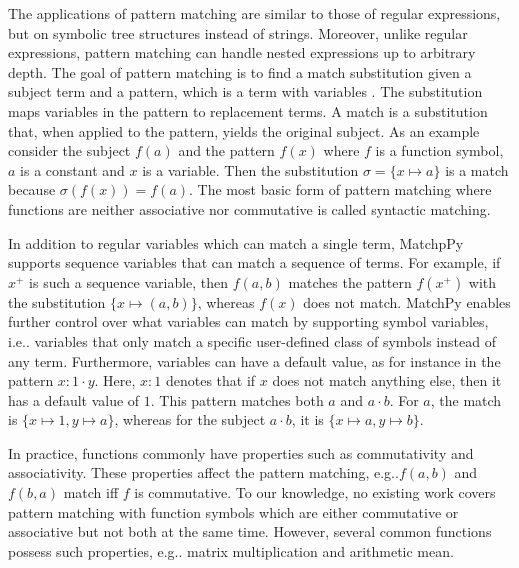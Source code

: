 \documentclass[conference,compsoc]{IEEEtran}
\makeatletter
\DeclareRobustCommand\onedot{\futurelet\@let@token\@onedot}
\def\@onedot{\ifx\@let@token.\else.\null\fi\xspace}
\def\eg{{e.g}\onedot} \def\Eg{{E.g}\onedot}
\def\ie{{i.e}\onedot} \def\Ie{{I.e}\onedot}
\newcommand{\regvar}[1]{#1}
\newcommand{\plusvar}[1]{{#1}^+}
\newcommand{\henrik}[1]{{\color{rwthgreen} Henrik: #1}}
\makeatother
\begin{document}
The applications of pattern matching are similar to those of regular expressions, but on symbolic tree structures instead of strings.
Moreover, unlike regular expressions, pattern matching can handle nested expressions up to arbitrary depth.
The goal of pattern matching is to find a match substitution given a subject term and a pattern, which is a term with variables \cite{Baader1998}.
The substitution maps variables in the pattern to replacement terms.
A match is a substitution that, when applied to the pattern, yields the original subject.
As an example consider the subject $f(a)$ and the pattern $f(x)$ where $f$ is a function symbol, $a$ is a constant and $x$ is a variable.
Then the substitution $\sigma = \{ x \mapsto a \}$ is a match because $\sigma(f(x)) = f(a)$.
The most basic form of pattern matching where functions are neither associative nor commutative is called syntactic matching.



In addition to regular variables which can match a single term, MatchpPy supports
sequence variables that can match a sequence of terms.
For example, if $\plusvar{x}$ is such a sequence variable, then $f(a, b)$ matches the pattern $f(\plusvar{x})$ with the substitution $\{ x \mapsto (a, b) \}$, whereas $f(\regvar{x})$ does not match.
MatchPy enables further control over what variables can match by supporting symbol variables,
\ie variables that only match a specific user-defined class of symbols instead of any term.
Furthermore, variables can have a default value, as for instance in the pattern $x{:}1 \cdot y$. Here, $x{:}1$ denotes that if
$x$ does not match anything else, then it has a default value of $1$. This
pattern matches both $a$ and $a \cdot b$. For $a$, the match is $\{ x \mapsto 1, y \mapsto a \}$, whereas for the subject $a \cdot b$, it is $\{ x \mapsto a, y \mapsto b \}$.

In practice, functions commonly have properties such as commutativity and associativity.
These properties affect the pattern matching, \eg $f(a, b)$ and $f(b, a)$ match iff $f$ is commutative.
To our knowledge, no existing work covers pattern matching with function symbols which are either commutative or associative but not both at the same time.
However, several common functions possess such properties,  \eg matrix multiplication and arithmetic mean.
\end{document}

